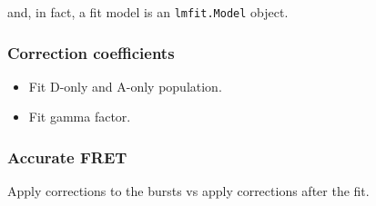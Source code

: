 and, in fact, a fit model is an \verb|lmfit.Model| object.

\subsubsection{Correction coefficients}

\begin{itemize}
\item Fit D-only and A-only population.
\item Fit gamma factor.
\end{itemize}


\subsubsection{Accurate FRET}

Apply corrections to the bursts vs apply corrections after the fit.


